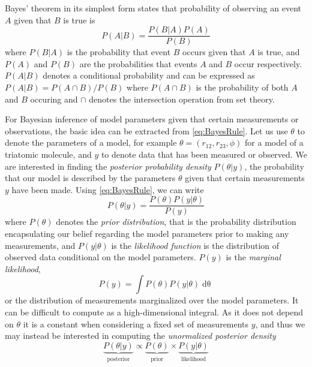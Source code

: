 Bayes' theorem in its simplest form states that probability of observing an event $A$ given that $B$ is true is
\begin{equation} \label{eq:BayesRule}
  P(A|B) = \frac{P(B|A) P(A)}{P(B)}
\end{equation}
where $P(B|A)$ is the probability that event $B$ occurs given that $A$ is true, and $P(A)$ and $P(B)$ are the probabilities that events $A$ and $B$ occur respectively. $P(A|B)$ denotes a conditional probability and can be expressed as $P(A|B) = P(A \cap B) / P(B)$ where $P(A \cap B)$ is the probability of both $A$ and $B$ occuring and $\cap$ denotes the intersection operation from set theory.\footnotemark~


For Bayesian inference of model parameters given that certain measurements or observations, the basic idea can be extracted from \eqref{eq:BayesRule}. Let us use $\theta$ to denote the parameters of a model, for example $\theta = (r_{12}, r_{23}, \phi)$ for a model of a triatomic molecule, and $y$ to denote data that has been measured or observed. We are interested in finding the \emph{posterior probability density} $P(\theta|y)$, the probability that our model is described by the parameters $\theta$ given that certain measurements $y$ have been made. Using \eqref{eq:BayesRule}, we can write
\begin{equation}
  P(\theta|y) = \frac{P(\theta) P(y|\theta)}{P(y)}
\end{equation}
where $P(\theta)$ denotes the \emph{prior distribution}, that is the probability distribution encapsulating our belief regarding the model parameters prior to making any measurements, and $P(y|\theta)$ is the \emph{likelihood function} is the distribution of observed data conditional on the model parameters. $P(y)$ is the \emph{marginal likelihood},
\begin{equation}
  P(y) = \int P(\theta) P(y|\theta) \mathop{d\theta}
\end{equation}
or the distribution of measurements marginalized over the model parameters. It can be difficult to compute as a high-dimensional integral. As it does not depend on $\theta$ it is a constant when considering a fixed set of measurements $y$, and thus we may instead be interested in computing the \emph{unormalized posterior density}
\begin{equation}
  \underbrace{P(\theta|y)}_\mathrm{posterior}
  \propto
  \underbrace{P(\theta)}_\mathrm{prior}
  \times
  \underbrace{P(y|\theta)}_\mathrm{likelihood}
\end{equation}

